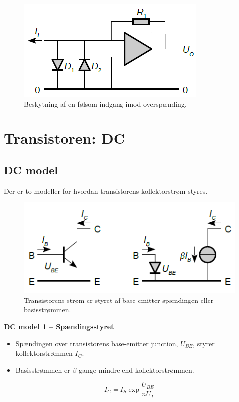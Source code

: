 \documentclass[danish]{article}
\begin{document}
\begin{figure} [H]
	\centering
	\includegraphics[width=0.5\linewidth]{graphics/diodebeskyt}
	\caption{Beskytning af en følsom indgang imod overspænding.}
	\label{fig:diodebeskyt}
\end{figure}

\newpage
\section{Transistoren: DC}

\subsection{DC model}
Der er to modeller for hvordan transistorens kollektorstrøm styres.
\begin{figure} [H]
	\centering
	\includegraphics[width=0.8\linewidth]{graphics/transistor_DCmodel}
	\caption{Transistorens strøm er styret af base-emitter spændingen eller basisstrømmen.}
	\label{fig:transistor_DCmodel}
\end{figure}

\textbf{DC model 1 – Spændingsstyret}
\begin{itemize}
	\item Spændingen over transistorens base-emitter junction, $U_{BE}$, styrer kollektorstrømmen $I_C$.
	\item Basisstrømmen er ${\beta}$ gange mindre end kollektorstrømmen.
\end{itemize}

\begin{equation}
I_C = I_S \exp \dfrac{U_{BE}}{n U_T}
\end{equation}
\end{document}
